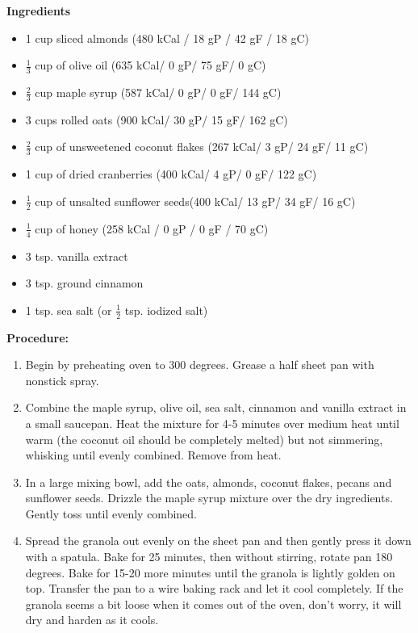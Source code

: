 \begin{multicols}{2}
\textbf{Ingredients}
\begin{itemize}
\item 1 cup sliced almonds \newline (480 kCal / 18 gP / 42 gF / 18 gC)
\item $\frac{1}{3}$ cup of olive oil \quad (635 kCal/ 0 gP/ 75 gF/ 0 gC)
\item $\frac{2}{3}$ cup maple syrup \quad (587 kCal/ 0 gP/ 0 gF/ 144 gC)
\item 3 cups rolled oats \quad (900 kCal/ 30 gP/ 15 gF/ 162 gC)
\item $\frac{2}{3}$ cup of unsweetened coconut flakes \newline (267 kCal/ 3 gP/ 24 gF/ 11 gC)
\item 1 cup of dried cranberries \newline (400 kCal/ 4 gP/ 0 gF/ 122 gC)
\item $\frac{1}{2}$ cup of unsalted sunflower seeds\newline (400 kCal/ 13 gP/ 34 gF/ 16 gC)
\item $\frac{1}{4}$ cup of honey \quad (258 kCal / 0 gP / 0 gF / 70 gC) 
\item 3 tsp. vanilla extract
\item 3 tsp. ground cinnamon
\item 1 tsp. sea salt (or $\frac{1}{2}$ tsp. iodized salt)



\end{itemize}


\columnbreak
\textbf{Procedure:}
\medskip


\begin{enumerate}
\item Begin by preheating oven to 300 degrees. Grease a half sheet pan with nonstick spray. 

\item Combine the maple syrup, olive oil, sea salt, cinnamon and vanilla extract in a small saucepan. Heat the mixture for 4-5 minutes over medium heat until warm (the coconut oil should be completely melted) but not simmering, whisking until evenly combined. Remove from heat. 

\item In a large mixing bowl, add the oats, almonds, coconut flakes, pecans and sunflower seeds. Drizzle the maple syrup mixture over the dry ingredients. Gently toss until evenly combined.

\item Spread the granola out evenly on the sheet pan and then gently press it down with a spatula. Bake for 25 minutes, then without stirring, rotate pan 180 degrees. Bake for 15-20 more minutes until the granola is lightly golden on top. Transfer the pan to a wire baking rack and let it cool completely. If the granola seems a bit loose when it comes out of the oven, don’t worry, it will dry and harden as it cools.


\end{enumerate}
\end{multicols}
